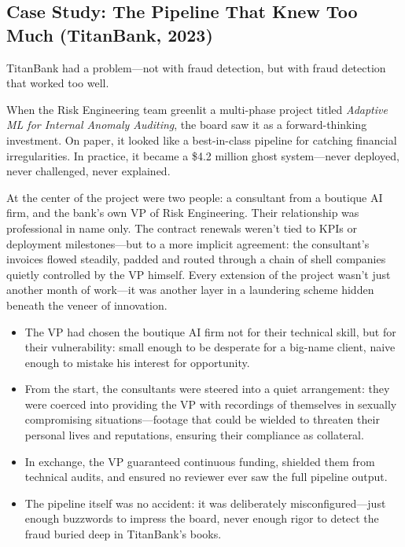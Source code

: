 \subsection{Case Study: The Pipeline That Knew Too Much (TitanBank, 2023)}

TitanBank had a problem—not with fraud detection, but with fraud detection that worked too well.

When the Risk Engineering team greenlit a multi-phase project titled \textit{Adaptive ML for Internal Anomaly Auditing}, the board saw it as a forward-thinking investment. On paper, it looked like a best-in-class pipeline for catching financial irregularities. In practice, it became a \$4.2 million ghost system—never deployed, never challenged, never explained.

At the center of the project were two people: a consultant from a boutique AI firm, and the bank’s own VP of Risk Engineering. Their relationship was professional in name only. The contract renewals weren’t tied to KPIs or deployment milestones—but to a more implicit agreement: the consultant’s invoices flowed steadily, padded and routed through a chain of shell companies quietly controlled by the VP himself. Every extension of the project wasn’t just another month of work—it was another layer in a laundering scheme hidden beneath the veneer of innovation.

\begin{itemize}
  \item The VP had chosen the boutique AI firm not for their technical skill, but for their vulnerability: small enough to be desperate for a big-name client, naive enough to mistake his interest for opportunity.
  \item From the start, the consultants were steered into a quiet arrangement: they were coerced into providing the VP with recordings of themselves in sexually compromising situations—footage that could be wielded to threaten their personal lives and reputations, ensuring their compliance as collateral.
  \item In exchange, the VP guaranteed continuous funding, shielded them from technical audits, and ensured no reviewer ever saw the full pipeline output.
  \item The pipeline itself was no accident: it was deliberately misconfigured—just enough buzzwords to impress the board, never enough rigor to detect the fraud buried deep in TitanBank’s books.
\end{itemize}


